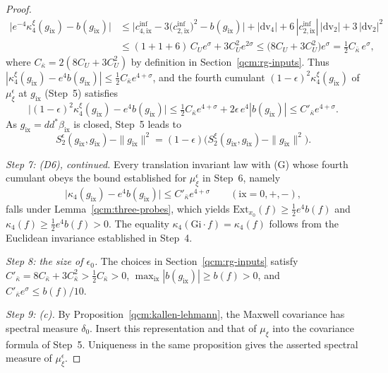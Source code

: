 \documentclass[11pt,letterpaper,reqno]{amsart}
\theoremstyle{definition}
\begin{document}
\begin{proof}
\begin{equation*}
\end{equation*}
\begin{align*}
\bigl|e^{-4}\kappa_4^\xi(g_{\mathrm{ix}})-b(g_{\mathrm{ix}})\bigr|&\le\bigl|c^{\mathrm{inf}}_{4,\mathrm{ix}}-3\bigl(c^{\mathrm{inf}}_{2,\mathrm{ix}}\bigr)^2-b(g_{\mathrm{ix}})\bigr|+|\mathrm{dv}_4|+6\,|c^{\mathrm{inf}}_{2,\mathrm{ix}}|\,|\mathrm{dv}_2|+3\,|\mathrm{dv}_2|^2\\
&\le(1+1+6)\,C_Ue^\sigma+3C_U^2e^{2\sigma}\le\bigl(8C_U+3C_U^2\bigr)e^\sigma=\tfrac12C_{\bar\kappa}\,e^\sigma,
\end{align*}
where $C_{\bar\kappa}=2(8C_U+3C_U^2)$ by definition in Section~\ref{qcm:rg-inputs}.
Thus $|\kappa_4^\xi(g_{\mathrm{ix}})-e^4b(g_{\mathrm{ix}})|\le\frac12C_{\bar\kappa}e^{4+\sigma}$, and the fourth cumulant $(1-\epsilon)^2\kappa_4^\xi(g_{\mathrm{ix}})$ of $\mu_\xi^\epsilon$ at $g_{\mathrm{ix}}$ (Step~5) satisfies
\begin{equation*}
\bigl|(1-\epsilon)^2\kappa_4^\xi(g_{\mathrm{ix}})-e^4b(g_{\mathrm{ix}})\bigr|\le\tfrac12C_{\bar\kappa}e^{4+\sigma}+2\epsilon\,e^4|b(g_{\mathrm{ix}})|\le C'_{\bar\kappa}e^{4+\sigma}.
\end{equation*}
As $g_{\mathrm{ix}}=dd^*\beta_{\mathrm{ix}}$ is closed, Step~5 leads to
\begin{equation*}
S_2^\epsilon(g_{\mathrm{ix}},g_{\mathrm{ix}})-\|g_{\mathrm{ix}}\|^2=(1-\epsilon)\bigl(S_2^\xi(g_{\mathrm{ix}},g_{\mathrm{ix}})-\|g_{\mathrm{ix}}\|^2\bigr).
\end{equation*}

\emph{Step 7: (D6), continued.}
Every translation invariant law with (G) whose fourth cumulant obeys the bound established for $\mu_\xi^\epsilon$ in Step~6, namely
\begin{equation*}
\bigl|\kappa_4(g_{\mathrm{ix}})-e^4b(g_{\mathrm{ix}})\bigr|\le C'_{\bar\kappa}e^{4+\sigma}\qquad(\mathrm{ix}=0,+,-),
\end{equation*}
falls under Lemma~\ref{qcm:three-probes}, which yields $\mathrm{Ext}_{x_0}(f)\ge\frac12e^4b(f)$ and $\kappa_4(f)\ge\frac12e^4b(f)>0$.
The equality $\kappa_4(\mathrm{Gi}\cdot f)=\kappa_4(f)$ follows from the Euclidean invariance established in Step~4.

\emph{Step 8: the size of $\epsilon_0$.}
The choices in Section~\ref{qcm:rg-inputs} satisfy $C'_{\bar\kappa}=8C_{\bar\kappa}+3C_{\bar\kappa}^2>\tfrac12C_{\bar\kappa}>0$, $\max_{\mathrm{ix}}|b(g_{\mathrm{ix}})|\ge b(f)>0$, and $C'_{\bar\kappa}e^\sigma\le b(f)/10$.

\emph{Step 9: (c).}
By Proposition~\ref{qcm:kallen-lehmann}, the Maxwell covariance has spectral measure $\delta_0$. Insert this representation and that of $\mu_\xi$ into the covariance formula of Step~5. Uniqueness in the same proposition gives the asserted spectral measure of $\mu_\xi^\epsilon$.


\end{proof}
\end{document}
